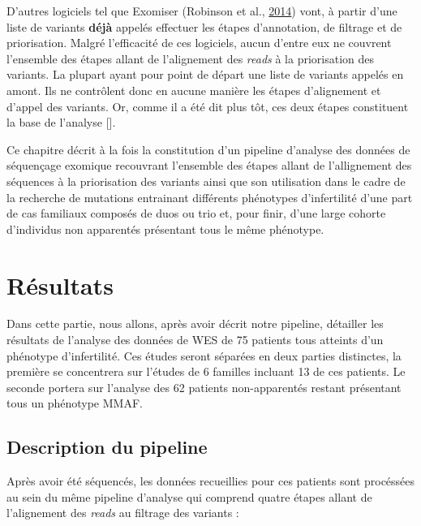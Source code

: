 \documentclass[12pt,twoside]{reedthesis}
\theoremstyle{definition}
\theoremstyle{definition}
\theoremstyle{remark}
\begin{document}
  D'autres logiciels tel que Exomiser (Robinson et al.,
  \protect\hyperlink{ref-Robinson2014}{2014}) vont, à partir d'une liste
  de variants \textbf{déjà} appelés effectuer les étapes d'annotation, de
  filtrage et de priorisation. Malgré l'efficacité de ces logiciels, aucun
  d'entre eux ne couvrent l'ensemble des étapes allant de l'alignement des
  \emph{reads} à la priorisation des variants. La plupart ayant pour point
  de départ une liste de variants appelés en amont. Ils ne contrôlent donc
  en aucune manière les étapes d'alignement et d'appel des variants. Or,
  comme il a été dit plus tôt, ces deux étapes constituent la base de
  l'analyse {[}{]}.
  
  Ce chapitre décrit à la fois la constitution d'un pipeline d'analyse des
  données de séquençage exomique recouvrant l'ensemble des étapes allant
  de l'allignement des séquences à la priorisation des variants ainsi que
  son utilisation dans le cadre de la recherche de mutations entrainant
  différents phénotypes d'infertilité d'une part de cas familiaux composés
  de duos ou trio et, pour finir, d'une large cohorte d'individus non
  apparentés présentant tous le même phénotype.
  
  \newpage
  
  \section{Résultats}\label{resultats}
  
  Dans cette partie, nous allons, après avoir décrit notre pipeline,
  détailler les résultats de l'analyse des données de WES de 75 patients
  tous atteints d'un phénotype d'infertilité. Ces études seront séparées
  en deux parties distinctes, la première se concentrera sur l'études de 6
  familles incluant 13 de ces patients. Le seconde portera sur l'analyse
  des 62 patients non-apparentés restant présentant tous un phénotype
  MMAF.
  
  \subsection{Description du pipeline}\label{description-du-pipeline}
  
  Après avoir été séquencés, les données recueillies pour ces patients
  sont procéssées au sein du même pipeline d'analyse qui comprend quatre
  étapes allant de l'alignement des \emph{reads} au filtrage des variants
  :
  
\end{document}
